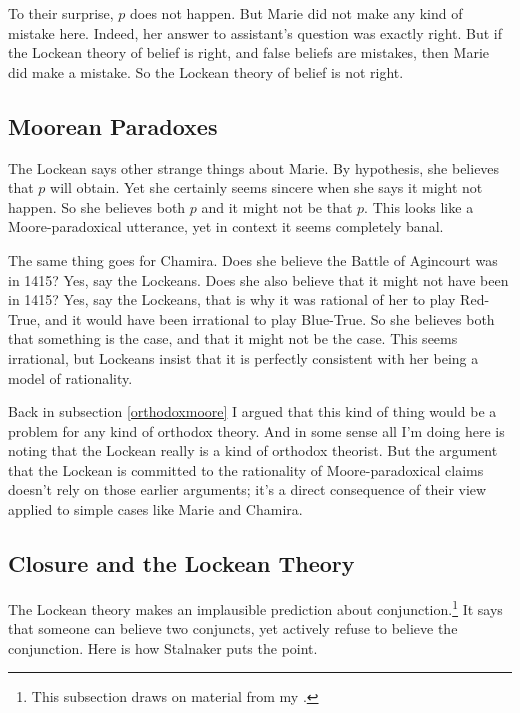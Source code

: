 \documentclass[11pt,]{book}
\let\rmarkdownfootnote\footnote%
\def\footnote{\protect\rmarkdownfootnote}
\begin{document}
To their surprise, \(p\) does not happen. But Marie did not make any kind of mistake here. Indeed, her answer to assistant's question was exactly right. But if the Lockean theory of belief is right, and false beliefs are mistakes, then Marie did make a mistake. So the Lockean theory of belief is not right.

\hypertarget{lockemoore}{%
\subsection{Moorean Paradoxes}\label{lockemoore}}

The Lockean says other strange things about Marie. By hypothesis, she believes that \(p\) will obtain. Yet she certainly seems sincere when she says it might not happen. So she believes both \(p\) and it might not be that \(p\). This looks like a Moore-paradoxical utterance, yet in context it seems completely banal.

The same thing goes for Chamira. Does she believe the Battle of Agincourt was in 1415? Yes, say the Lockeans. Does she also believe that it might not have been in 1415? Yes, say the Lockeans, that is why it was rational of her to play Red-True, and it would have been irrational to play Blue-True. So she believes both that something is the case, and that it might not be the case. This seems irrational, but Lockeans insist that it is perfectly consistent with her being a model of rationality.

Back in subsection \ref{orthodoxmoore} I argued that this kind of thing would be a problem for any kind of orthodox theory. And in some sense all I'm doing here is noting that the Lockean really is a kind of orthodox theorist. But the argument that the Lockean is committed to the rationality of Moore-paradoxical claims doesn't rely on those earlier arguments; it's a direct consequence of their view applied to simple cases like Marie and Chamira.

\hypertarget{closure}{%
\subsection{Closure and the Lockean Theory}\label{closure}}

The Lockean theory makes an implausible prediction about conjunction.\footnote{This subsection draws on material from my \citeyearpar{Weatherson2014}.} It says that someone can believe two conjuncts, yet actively refuse to believe the conjunction. Here is how Stalnaker puts the point.
\end{document}

